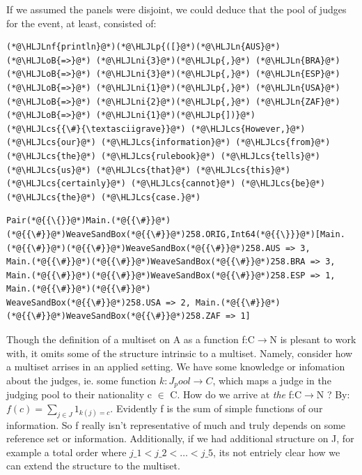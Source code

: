\documentclass[12pt,a4paper]{article}
\newcommand{\HLJLn}[1]{#1}
\newcommand{\HLJLnf}[1]{\textcolor[RGB]{66,102,213}{#1}}
\newcommand{\HLJLni}[1]{\textcolor[RGB]{59,151,46}{#1}}
\newcommand{\HLJLoB}[1]{\textcolor[RGB]{102,102,102}{\textbf{#1}}}
\newcommand{\HLJLp}[1]{#1}
\newcommand{\HLJLcs}[1]{\textcolor[RGB]{153,153,119}{\textit{#1}}}
\begin{document}
If we assumed the panels were disjoint, we could deduce that the pool of judges for the event, at least, consisted of:


\begin{lstlisting}
(*@\HLJLnf{println}@*)(*@\HLJLp{([}@*)(*@\HLJLn{AUS}@*) (*@\HLJLoB{=>}@*) (*@\HLJLni{3}@*)(*@\HLJLp{,}@*) (*@\HLJLn{BRA}@*) (*@\HLJLoB{=>}@*) (*@\HLJLni{3}@*)(*@\HLJLp{,}@*) (*@\HLJLn{ESP}@*) (*@\HLJLoB{=>}@*) (*@\HLJLni{1}@*)(*@\HLJLp{,}@*) (*@\HLJLn{USA}@*) (*@\HLJLoB{=>}@*) (*@\HLJLni{2}@*)(*@\HLJLp{,}@*) (*@\HLJLn{ZAF}@*) (*@\HLJLoB{=>}@*) (*@\HLJLni{1}@*)(*@\HLJLp{])}@*)
(*@\HLJLcs{{\#}{\textasciigrave}}@*) (*@\HLJLcs{However,}@*) (*@\HLJLcs{our}@*) (*@\HLJLcs{information}@*) (*@\HLJLcs{from}@*) (*@\HLJLcs{the}@*) (*@\HLJLcs{rulebook}@*) (*@\HLJLcs{tells}@*) (*@\HLJLcs{us}@*) (*@\HLJLcs{that}@*) (*@\HLJLcs{this}@*) (*@\HLJLcs{certainly}@*) (*@\HLJLcs{cannot}@*) (*@\HLJLcs{be}@*) (*@\HLJLcs{the}@*) (*@\HLJLcs{case.}@*)
\end{lstlisting}

\begin{lstlisting}
Pair(*@{{\{}}@*)Main.(*@{{\#}}@*)(*@{{\#}}@*)WeaveSandBox(*@{{\#}}@*)258.ORIG,Int64(*@{{\}}}@*)[Main.(*@{{\#}}@*)(*@{{\#}}@*)WeaveSandBox(*@{{\#}}@*)258.AUS => 3, 
Main.(*@{{\#}}@*)(*@{{\#}}@*)WeaveSandBox(*@{{\#}}@*)258.BRA => 3, Main.(*@{{\#}}@*)(*@{{\#}}@*)WeaveSandBox(*@{{\#}}@*)258.ESP => 1, Main.(*@{{\#}}@*)(*@{{\#}}@*)
WeaveSandBox(*@{{\#}}@*)258.USA => 2, Main.(*@{{\#}}@*)(*@{{\#}}@*)WeaveSandBox(*@{{\#}}@*)258.ZAF => 1]
\end{lstlisting}


Though the definition of a multiset on A as a function f:C\ensuremath{\rightarrow}N is plesant to work with, it omits some of the structure intrinsic to a multiset. Namely, consider how a multiset arrises in an applied setting. We have some knowledge or infomation about the judges, ie. some function $k: J_pool \ensuremath{\rightarrow} C$, which maps a judge in the judging pool to their nationality c \ensuremath{\in} C. How do we arrive at \emph{the} f:C\ensuremath{\rightarrow}N ? By: $f(c) = \ensuremath{\sum}_{j \ensuremath{\in} J} 1_{k(j)=c }$. Evidently f is the sum of simple functions of our information. So f really isn't representative of much and truly depends on some reference set or information. Additionally, if we had additional structure on J, for example a total order where $j\ensuremath{\_1} < j\ensuremath{\_2} < \ensuremath{\ldots} < j\ensuremath{\_5}$, its not entriely clear how we can extend the structure to the multiset.
\end{document}

